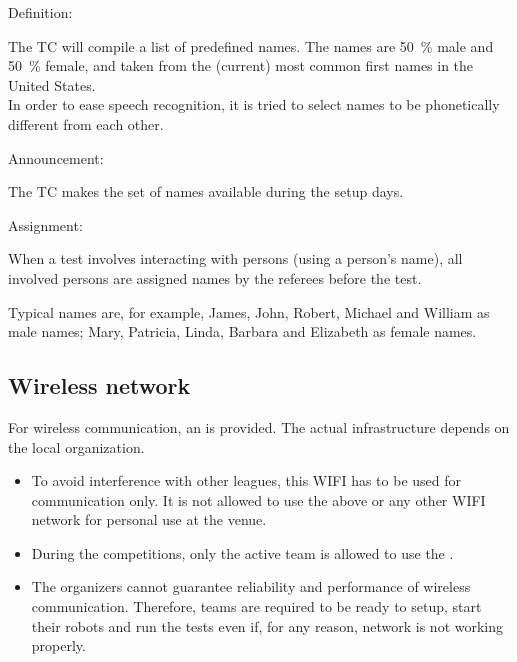 \begin{enumerate}
{\bf\item Definition:} The TC will compile a list of \NumNames predefined names.
  The names are \SI{50}{\percent} male and \SI{50}{\percent} female,
  and taken from the (current) most common first names in the United States.\\
  In order to ease speech recognition, it is tried to select names to be phonetically different from each other. 
{\bf\item Announcement:} The TC makes the set of names available during the setup days.
{\bf\item Assignment:} When a test involves interacting with persons (using a person's name),
  all involved persons are assigned names by the referees before the test. 
\end{enumerate}

Typical names are, for example, James, John, Robert, Michael and William as male names;
Mary, Patricia, Linda, Barbara and Elizabeth as female names.


\subsection{Wireless network}\label{rule:scenario_wifi}

For wireless communication, an  is provided.
The actual infrastructure depends on the local organization. 

\begin{itemize}
\item To avoid interference with other leagues, this WIFI has to be used for communication only. 
  It is not allowed to use the above or any other WIFI network for personal use at the venue.
\item During the competitions, only the active team is allowed to use the . 
\item The organizers cannot guarantee reliability and performance of wireless communication. 
Therefore, teams are required to be ready to setup, start their robots and run the tests even if, for any reason, network is not working properly.
\end{itemize}


